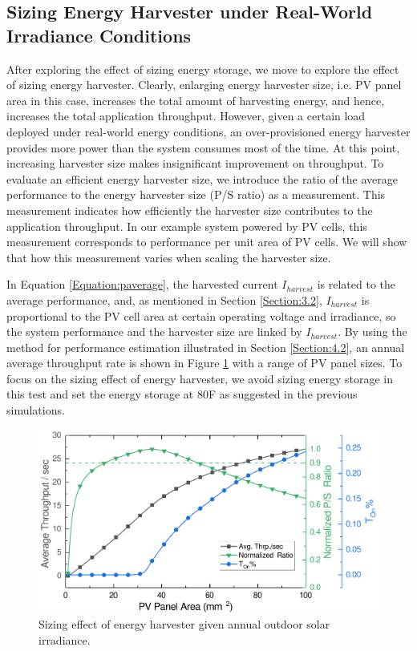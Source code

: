 \subsection{Sizing Energy Harvester under Real-World Irradiance Conditions} \label{Section:4.4}

After exploring the effect of sizing energy storage, we move to explore the effect of sizing energy harvester. Clearly, enlarging energy harvester size, i.e. PV panel area in this case, increases the total amount of harvesting energy, and hence, increases the total application throughput. However, given a certain load deployed under real-world energy conditions, an over-provisioned energy harvester provides more power than the system consumes most of the time. At this point, increasing harvester size makes insignificant improvement on throughput. To evaluate an efficient energy harvester size, we introduce the ratio of the average performance to the energy harvester size (P/S ratio) as a measurement. This measurement indicates how efficiently the harvester size contributes to the application throughput. In our example system powered by PV cells, this measurement corresponds to performance per unit area of PV cells. We will show  that how this measurement varies when scaling the harvester size. 

In Equation \ref{Equation:paverage}, the harvested current $I_{harvest}$ is related to the average performance, and, as mentioned in Section \ref{Section:3.2}, $I_{harvest}$ is proportional to the PV cell area at certain operating voltage and irradiance, so the system performance and the harvester size are linked by $I_{harvest}$. By using the method for performance estimation illustrated in Section \ref{Section:4.2}, an annual average throughput rate is shown in Figure \ref{Figure:SizeHar} with a range of PV panel sizes. To focus on the sizing effect of energy harvester, we avoid sizing energy storage in this test and set the energy storage at 80\textmu F as suggested in the previous simulations. 

\begin{figure}[H]
    \centering
    \includegraphics[width=13cm]{figure/work1/SizeHar}
    \caption{Sizing effect of energy harvester given annual outdoor solar irradiance.}
    \label{Figure:SizeHar}
\end{figure}


